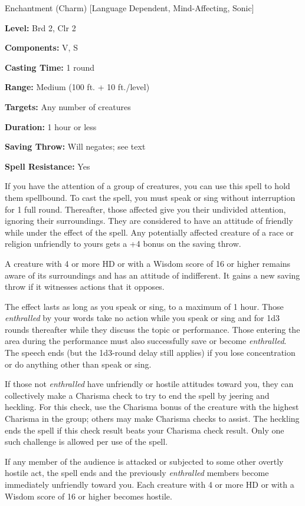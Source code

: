 
Enchantment (Charm) [Language Dependent, Mind-Affecting, Sonic]

\textbf{Level:} Brd 2, Clr 2

\textbf{Components:} V, S

\textbf{Casting Time:} 1 round

\textbf{Range:} Medium (100 ft. + 10 ft./level)

\textbf{Targets:} Any number of creatures

\textbf{Duration:} 1 hour or less

\textbf{Saving Throw:} Will negates; see text

\textbf{Spell Resistance:} Yes

If you have the attention of a group of creatures, you can use this spell to hold 
them spellbound. To cast the spell, you must speak or sing without interruption 
for 1 full round. Thereafter, those affected give you their undivided attention, 
ignoring their surroundings. They are considered to have an attitude of friendly 
while under the effect of the spell. Any potentially affected creature of a race 
or religion unfriendly to yours gets a +4 bonus on the saving throw.

A creature with 4 or more HD or with a Wisdom score of 16 or higher remains aware 
of its surroundings and has an attitude of indifferent. It gains a new saving throw 
if it witnesses actions that it opposes.

The effect lasts as long as you speak or sing, to a maximum of 1 hour. Those \textit{enthralled 
}by your words take no action while you speak or sing and for 1d3 rounds thereafter 
while they discuss the topic or performance. Those entering the area during the 
performance must also successfully save or become \textit{enthralled}. The speech 
ends (but the 1d3-round delay still applies) if you lose concentration or do anything 
other than speak or sing.

If those not \textit{enthralled} have unfriendly or hostile attitudes toward you, 
they can collectively make a Charisma check to try to end the spell by jeering 
and heckling. For this check, use the Charisma bonus of the creature with the highest 
Charisma in the group; others may make Charisma checks to assist. The heckling 
ends the spell if this check result beats your Charisma check result. Only one 
such challenge is allowed per use of the spell.

If any member of the audience is attacked or subjected to some other overtly hostile 
act, the spell ends and the previously \textit{enthralled} members become immediately 
unfriendly toward you. Each creature with 4 or more HD or with a Wisdom score of 
16 or higher becomes hostile.

